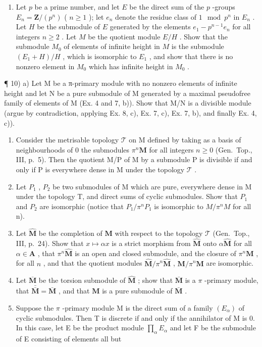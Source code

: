\begin{enumerate}
\def\labelenumi{\alph{enumi})}
\setcounter{enumi}{1}
\tightlist
\item
  Let \(p\) be a prime number, and let \(E\) be the direct sum of the \(p\) -groups \(E_n = \mathbf{Z} / (p^n)\) ( \(n \geqslant 1\) ); let \(e_n\) denote the residue class of \(1 \mod p^n\) in \(E_n\) . Let \(H\) be the submodule of \(E\) generated by the elements \(e_1 - p^{n-1}e_n\) for all integers \(n \geqslant 2\) . Let \(M\) be the quotient module \(E / H\) . Show that the submodule \(M_0\) of elements of infinite height in \(M\) is the submodule \((E_1 + H) / H\) , which is isomorphic to \(E_1\) , and show that there is no nonzero element in \(M_0\) which has infinite height in \(M_0\) .
\end{enumerate}

¶ 10) a) Let M be a π-primary module with no nonzero elements of infinite height and let N be a pure submodule of M generated by a maximal pseudofree family of elements of M (Ex. 4 and 7, b)). Show that M/N is a divisible module (argue by contradiction, applying Ex. 8, c), Ex. 7, c), Ex. 7, b), and finally Ex. 4, c)).

\begin{enumerate}
\def\labelenumi{\alph{enumi})}
\setcounter{enumi}{1}
\item
  Consider the metrisable topology \(\mathcal{T}\) on M defined by taking as a basis of neighbourhoods of 0 the submodules \(\pi^n\mathbf{M}\) for all integers \(n\geqslant 0\) (Gen.~Top., III, p.~5). Then the quotient M/P of M by a submodule P is divisible if and only if P is everywhere dense in M under the topology \(\mathcal{T}\) .
\item
  Let \(P_{1}\) , \(P_{2}\) be two submodules of M which are pure, everywhere dense in M under the topology T, and direct sums of cyclic submodules. Show that \(P_{1}\) and \(P_{2}\) are isomorphic (notice that \(P_{1}/\pi^{n}P_{1}\) is isomorphic to \(M/\pi^{n}M\) for all n).
\item
  Let \(\hat{\mathbf{M}}\) be the completion of \(\mathbf{M}\) with respect to the topology \(\mathcal{T}\) (Gen.~Top., III, p.~24). Show that \(x \mapsto \alpha x\) is a strict morphism from \(\hat{\mathbf{M}}\) onto \(\alpha \hat{\mathbf{M}}\) for all \(\alpha \in \mathbf{A}\) , that \(\pi^n \hat{\mathbf{M}}\) is an open and closed submodule, and the closure of \(\pi^n \mathbf{M}\) , for all \(n\) , and that the quotient modules \(\hat{\mathbf{M}} / \pi^n \hat{\mathbf{M}}\) , \(\mathbf{M} / \pi^n \mathbf{M}\) are isomorphic.
\item
  Let \(\bar{\mathbf{M}}\) be the torsion submodule of \(\hat{\mathbf{M}}\) ; show that \(\bar{\mathbf{M}}\) is a \(\pi\) -primary module, that \(\bar{\bar{\mathbf{M}}} = \bar{\mathbf{M}}\) , and that \(\mathbf{M}\) is a pure submodule of \(\bar{\mathbf{M}}\) .
\item
  Suppose the \(\pi\) -primary module M is the direct sum of a family \((E_{\alpha})\) of cyclic submodules. Then T is discrete if and only if the annihilator of M is 0. In this case, let E be the product module \(\prod_{\alpha} E_{\alpha}\) and let F be the submodule of E consisting of elements all but
\end{enumerate}


